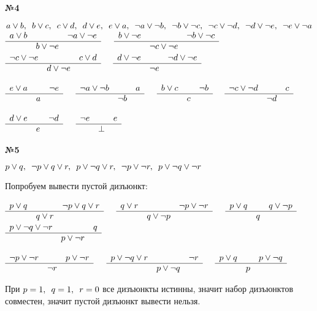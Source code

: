 \documentclass{article}
\newenvironment{task}{\begin{center}\fontsize{14}{14}\selectfont\bf}{\rm\fontsize{12}{12}\selectfont\end{center}}
\newcommand{\res}[3]{\begin{array}{lcr} #1 & & #2 \\ \hline & #3 \end{array}}
\newcommand{\com}{, \hspace{5px}}
\begin{document}
	\begin{task} 
		№4
	\end{task}
	\begin{center}
		$a \vee b \com b \vee c \com c\vee d \com d\vee e \com e\vee a \com \neg a \vee \neg b \com \neg b \vee \neg c \com \neg c \vee \neg d \com \neg d \vee \neg e \com \neg e \vee\neg a$\\ \vspace{5px}
		$\res{a\vee b}{\neg a \vee \neg e}{b \vee \neg e}\quad$
		$\res{b \vee \neg e}{\neg b \vee\neg c}{\neg c \vee \neg e}\quad$
		$\res{\neg c \vee \neg e}{c \vee d}{d \vee \neg e}\quad$
		$\res{d \vee \neg e}{\neg d \vee \neg e}{\neg e}\quad$ \\ \vspace{5px}
		
		$\res{e \vee a}{\neg e}{a}\quad$
		$\res{\neg a \vee \neg b}{a}{\neg b}\quad$
		$\res{b \vee c}{\neg b}{c}\quad$
		$\res{\neg c \vee \neg d}{c}{\neg d}\quad$ \\ \vspace{5px}
		
		$\res{d \vee e}{\neg d}{e}\quad$
		$\res{\neg e}{e}{\bot}\quad$
	\end{center}
	
	
	
		
	\begin{task} 
		№5
	\end{task}
	\begin{center}
		$p \vee q \com \neg p \vee q \vee r \com p \vee \neg q \vee r \com \neg p \vee \neg r \com p \vee\neg q \vee \neg r$
	\end{center}
	Попробуем вывести пустой дизъюнкт:
	\begin{center}
		$\res{p \vee q}{\neg p \vee q \vee r}{q\vee r}\quad$
		$\res{q\vee r}{\neg p \vee \neg r}{q \vee \neg p}\quad$
		$\res{p \vee q}{q \vee \neg p}{q}\quad$
		$\res{p \vee\neg q \vee \neg r}{q}{p\vee \neg r}\quad$ \\ \vspace{5px}
		
		$\res{\neg p \vee \neg r}{p\vee \neg r}{\neg r}\quad$
		$\res{p \vee \neg q \vee r}{\neg r}{p \vee \neg q}\quad$
		$\res{p \vee q}{p \vee \neg q}{p}\quad$ \\ \vspace{5px}
	\end{center}
	При $p = 1 \com q = 1 \com r = 0$ все дизъюнкты истинны, значит набор дизъюнктов совместен, значит пустой дизъюнкт вывести нельзя.
	
\end{document}
